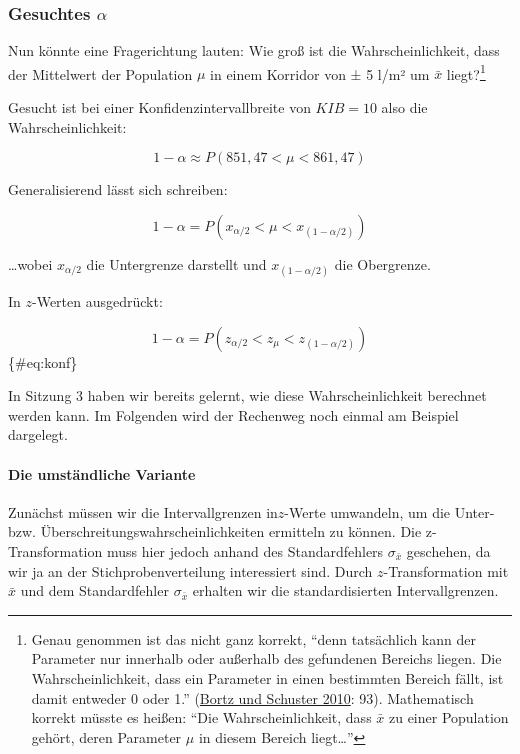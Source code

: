 \documentclass[
  ngerman,
]{article}
\begin{document}
\hypertarget{gesuchtes-alpha}{%
\subsubsection{\texorpdfstring{Gesuchtes \(\alpha\)}{Gesuchtes \textbackslash alpha}}\label{gesuchtes-alpha}}

Nun könnte eine Fragerichtung lauten: Wie groß ist die Wahrscheinlichkeit, dass der Mittelwert der Population \(\mu\) in einem Korridor von ± 5 l/m² um \(\bar{x}\) liegt?\footnote{Genau genommen ist das nicht ganz korrekt, ``denn tatsächlich kann der Parameter nur innerhalb oder außerhalb des gefundenen Bereichs liegen. Die Wahrscheinlichkeit, dass ein Parameter in einen bestimmten Bereich fällt, ist damit entweder 0 oder 1.'' (\protect\hyperlink{ref-bortz}{Bortz und Schuster 2010}: 93). Mathematisch korrekt müsste es heißen: ``Die Wahrscheinlichkeit, dass \(\bar{x}\) zu einer Population gehört, deren Parameter \(\mu\) in diesem Bereich liegt\ldots{}''}

Gesucht ist bei einer Konfidenzintervallbreite von \(\textit{KIB}=10\) also die Wahrscheinlichkeit:

\nopagebreak

\[1-\alpha\approx P(851{,}47 < \mu < 861{,}47)\]

Generalisierend lässt sich schreiben:

\nopagebreak

\[
1-\alpha=P(x_{\alpha/2} < \mu < x_{(1-\alpha/2)})
\]

\nopagebreak

\ldots wobei \(x_{\alpha/2}\) die Untergrenze darstellt und \(x_{(1-\alpha/2)}\) die Obergrenze.

In \(z\)-Werten ausgedrückt:

\nopagebreak

\[
1-\alpha=P(z_{\alpha/2} < z_{\mu} < z_{(1-\alpha/2)})
\]\{\#eq:konf\}

In Sitzung 3 haben wir bereits gelernt, wie diese Wahrscheinlichkeit berechnet werden kann. Im Folgenden wird der Rechenweg noch einmal am Beispiel dargelegt.

\hypertarget{die-umstuxe4ndliche-variante}{%
\paragraph{Die umständliche Variante}\label{die-umstuxe4ndliche-variante}}

Zunächst müssen wir die Intervallgrenzen in\(z\)-Werte umwandeln, um die Unter- bzw. Überschreitungswahrscheinlichkeiten ermitteln zu können. Die z-Transformation muss hier jedoch anhand des Standardfehlers \(\sigma_{\bar{x}}\) geschehen, da wir ja an der Stichprobenverteilung interessiert sind. Durch \(z\)-Transformation mit \(\bar{x}\) und dem Standardfehler \(\sigma_{\bar{x}}\) erhalten wir die standardisierten Intervallgrenzen.
\end{document}
